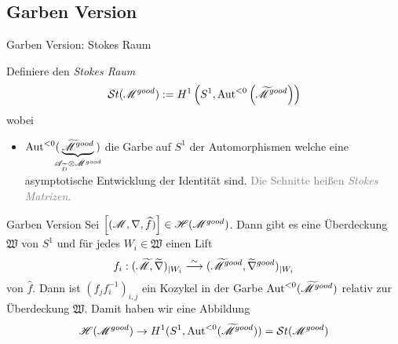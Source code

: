 \subsection{Garben Version}
\begin{frame}[t]{Garben Version: Stokes Raum}
  \begin{defn}
    Definiere den \emph{Stokes Raum}
    \[
      \mathcal{S}{}t(\mathscr{M}^{good})
        :=H^1\left(S^1,\operatorname{Aut}^{<0}\left(\widetilde {\mathscr{M}}^{good}\right)\right)
    \]
    wobei
    \begin{itemize}
      \item $\operatorname{Aut}^{<0}(\!\!\!\underset{\mathscr{A}_{\widetilde D}\otimes\mathscr{M}^{good}}
        {\underbrace{\widetilde{\mathscr{M}}^{good}}}\!\!\!)$
        die Garbe auf $S^1$ der Automorphismen welche eine asymptotische
        Entwicklung der Identität sind.
        \textcolor{gray}{Die Schnitte heißen \emph{Stokes Matrizen}.}
    \end{itemize}
  \end{defn}
\end{frame}
\begin{frame}[t]{Garben Version}
  Sei $\left[(\mathscr{M},\nabla,\widehat f)\right]\in\mathscr{H}(\mathscr{M}^{good})$. Dann gibt es eine
  Überdeckung $\mathfrak{W}$ von $S^1$ und für jedes $W_i\in\mathfrak{W}$ einen
  Lift
  \[
    f_i:(\widetilde{\mathscr{M}},\widetilde\nabla)_{|W_i}
    \overset{\sim}{\longrightarrow}
    (\widetilde{\mathscr{M}}^{good},\widetilde\nabla^{good})_{|W_i}
  \]
  von $\hat f$.
  Dann ist $(f_jf_i^{-1})_{i,j}$ ein Kozykel in der Garbe
  $\operatorname{Aut}^{<0}(\widetilde{\mathscr{M}}^{good})$ relativ zur Überdeckung $\mathfrak{W}$.
  Damit haben wir eine Abbildung
  \[
    \mathscr{H}(\mathscr{M}^{good})\to H^1(S^1,\operatorname{Aut}^{<0}(\widetilde{\mathscr{M}}^{good}))=\mathcal{S}{}t(\mathscr{M}^{good})
  \]
\end{frame}

